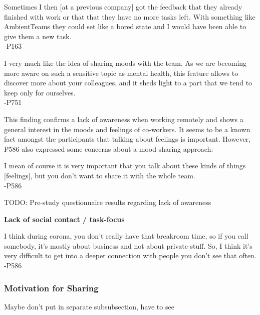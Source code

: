 \begin{displayquote}
    Sometimes I then [at a previous company] got the feedback that they already finished with work or that that they have no more tasks left. With something like AmbientTeams they could set like a bored state and I would have been able to give them a new task. \\
    -P163
\end{displayquote}

\begin{displayquote}
    I very much like the idea of sharing moods with the team. As we are becoming more aware on such a sensitive topic as mental health, this feature allows to discover more about your colleagues, and it sheds light to a part that we tend to keep only for ourselves. \\
    -P751
\end{displayquote}

This finding confirms a lack of awareness when working remotely and shows a general interest in the moods and feelings of co-workers. It seems to be a known fact amongst the participants that talking about feelings is important. However, P586 also expressed some concerns about a mood sharing approach:

\begin{displayquote}
    I mean of course it is very important that you talk about these kinds of things [feelings], but you don't want to share it with the whole team. \\
    -P586
\end{displayquote}

TODO: Pre-study questionnaire results regarding lack of awareness

\textbf{Lack of social contact / task-focus} \\

\begin{displayquote}
    I think during corona, you don't really have that breakroom time, so if you call somebody, it's mostly about business and not about private stuff. So, I think it's very difficult to get into a deeper connection with people you don't see that often. \\
    -P586
\end{displayquote}

\subsubsection{Motivation for Sharing}
Maybe don't put in separate subsubsection, have to see


